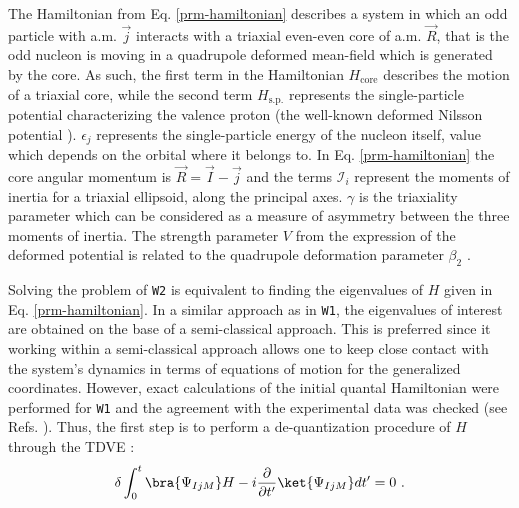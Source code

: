\documentclass[myclassdoc,debug]{rjparticle}
\begin{document}
The Hamiltonian from Eq. \ref{prm-hamiltonian} describes a system in which an odd particle with a.m. $\vec{j}$ interacts with a triaxial even-even core of a.m. $\vec{R}$, that is the odd nucleon is moving in a quadrupole deformed mean-field which is generated by the core. As such, the first term in the Hamiltonian $H_\text{core}$ describes the motion of a triaxial core, while the second term $H_\text{s.p.}$ represents the single-particle potential characterizing the valence proton (the well-known deformed Nilsson potential \cite{meyer1975collective,wang2008description}). $\epsilon_j$ represents the single-particle energy of the nucleon itself, value which depends on the orbital where it belongs to. In Eq. \ref{prm-hamiltonian} the core angular momentum is $\vec{R}=\vec{I}-\vec{j}$ and the terms $\mathcal{I}_i$ represent the moments of inertia for a triaxial ellipsoid, along the principal axes. $\gamma$ is the triaxiality parameter \cite{bohr1998nuclear} which can be considered as a measure of asymmetry between the three moments of inertia. The strength parameter $V$ from the expression of the deformed potential is related to the quadrupole deformation parameter $\beta_2$ \cite{bohr1998nuclear}.

Solving the problem of \texttt{W2} is equivalent to finding the eigenvalues of $H$ given in Eq. \ref{prm-hamiltonian}. In a similar approach as in \texttt{W1}, the eigenvalues of interest are obtained on the base of a semi-classical approach. This is preferred since it working within a semi-classical approach allows one to keep close contact with the system's dynamics in terms of equations of motion for the generalized coordinates. However, exact calculations of the initial quantal Hamiltonian were performed for \texttt{W1} and the agreement with the experimental data was checked (see Refs. \cite{raduta2020towards,raduta2020new}). Thus, the first step is to perform a de-quantization procedure of $H$ through the TDVE \cite{raduta2007semiclassical,budaca2018tilted,raduta2017semiclassical}:
\begin{align}
    \delta\int_0^t\bra{\Psi_{IjM}}H-i\frac{\partial}{\partial t'}\ket{\Psi_{IjM}}dt'=0\ .
    \label{tdve}
\end{align}
\end{document}
